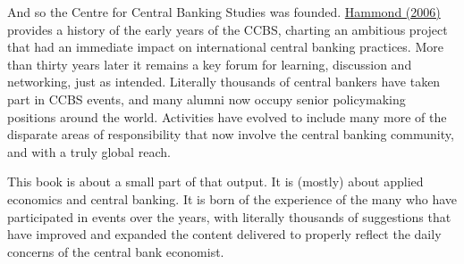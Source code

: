 \documentclass[
  letterpaper,
]{book}
\begin{document}
And so the Centre for Central Banking Studies was founded.
\href{https://www.bankofengland.co.uk/-/media/boe/files/quarterly-bulletin/2006/the-centre-for-central-banking-studies.pdf}{Hammond
(2006)} provides a history of the early years of the CCBS, charting an
ambitious project that had an immediate impact on international central
banking practices. More than thirty years later it remains a key forum
for learning, discussion and networking, just as intended. Literally
thousands of central bankers have taken part in CCBS events, and many
alumni now occupy senior policymaking positions around the world.
Activities have evolved to include many more of the disparate areas of
responsibility that now involve the central banking community, and with
a truly global reach.

This book is about a small part of that output. It is (mostly) about
applied economics and central banking. It is born of the experience of
the many who have participated in events over the years, with literally
thousands of suggestions that have improved and expanded the content
delivered to properly reflect the daily concerns of the central bank
economist.
\end{document}
